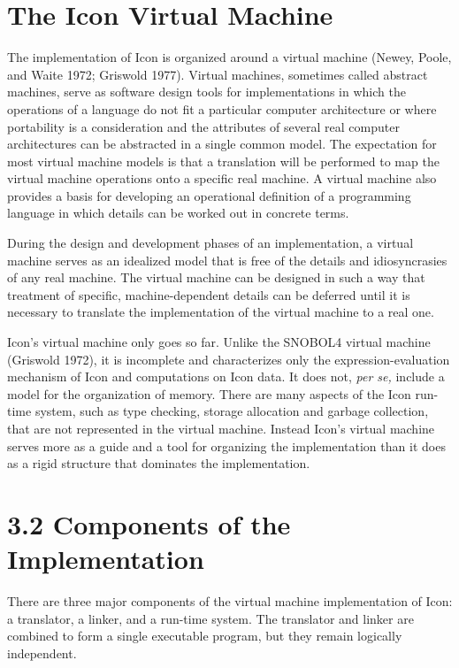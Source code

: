 \section{The Icon Virtual Machine}

The implementation of Icon is organized around a virtual machine
(Newey, Poole, and Waite 1972; Griswold 1977). Virtual machines,
sometimes called abstract machines, serve as software design tools for
implementations in which the operations of a language do not fit a
particular computer architecture or where portability is a
consideration and the attributes of several real computer
architectures can be abstracted in a single common model. The
expectation for most virtual machine models is that a translation will
be performed to map the virtual machine operations onto a specific
real machine. A virtual machine also provides a basis for developing
an operational definition of a programming language in which details
can be worked out in concrete terms.

During the design and development phases of an implementation, a
virtual machine serves as an idealized model that is free of the
details and idiosyncrasies of any real machine. The virtual machine
can be designed in such a way that treatment of specific,
machine-dependent details can be deferred until it is necessary to
translate the implementation of the virtual machine to a real one.

Icon's virtual machine only goes so far. Unlike the SNOBOL4 virtual
machine (Griswold 1972), it is incomplete and characterizes only the
expression-evaluation mechanism of Icon and computations on Icon
data. It does not, \textit{per se, }include a model for the
organization of memory. There are many aspects of the Icon run-time
system, such as type checking, storage allocation and garbage
collection, that are not represented in the virtual machine. Instead
Icon's virtual machine serves more as a guide and a tool for
organizing the implementation than it does as a rigid structure that
dominates the implementation.


\section[3.2 Components of the Implementation]{3.2 \textbf{Components of the Implementation}}

There are three major components of the virtual machine implementation
of Icon: a translator, a linker, and a run-time system. The translator
and linker are combined to form a single executable program, but they
remain logically independent.

